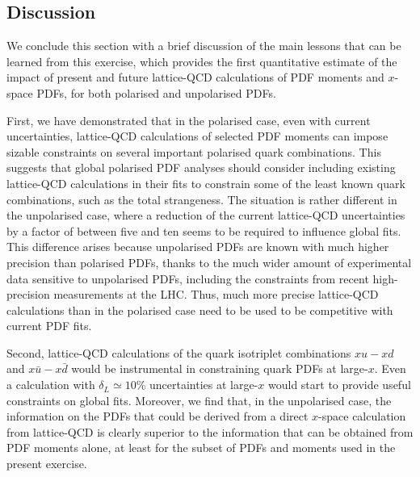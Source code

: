 \subsection{Discussion}

We conclude this section with a brief discussion of the main lessons that
can be learned from this exercise, which provides the first quantitative estimate
of the impact of present and future lattice-QCD calculations of PDF moments
and $x$-space PDFs, for both polarised and unpolarised PDFs.

First, we have demonstrated that in the polarised case,
even with current uncertainties, lattice-QCD calculations of
selected PDF moments can impose sizable constraints on several
important polarised quark combinations.
%
This suggests that global polarised PDF analyses should consider
including existing lattice-QCD calculations in their fits to constrain some
of the least known quark combinations, such as the total strangeness.
%
The situation is rather different in the unpolarised case,
where a reduction of the current lattice-QCD uncertainties by a factor of between five 
and ten seems to be required to influence global fits.
%
This difference arises because unpolarised PDFs are known with much higher precision than polarised
PDFs, thanks to the much wider amount of experimental data sensitive to unpolarised PDFs,
including the constraints from recent high-precision measurements at the
LHC.
%
Thus, much more precise lattice-QCD calculations than in the polarised case
need to be used to be competitive with current PDF fits.

Second, lattice-QCD calculations of the quark isotriplet combinations
$xu-xd$ and $x\bar{u}-x\bar{d}$ would be instrumental in constraining
quark PDFs at large-$x$.
%
Even a calculation with $\delta_L\simeq 10\%$ uncertainties at large-$x$ would
start to provide useful constraints on global fits.
%
Moreover, we find that, in the unpolarised case, the information on the
PDFs that could be derived from a direct $x$-space calculation
from lattice-QCD is clearly superior to the information that can be obtained
from PDF moments alone, at least for the subset of PDFs and moments used in the present
exercise.

